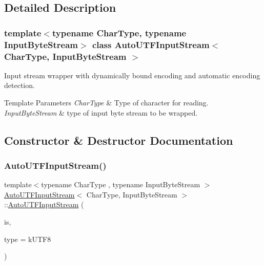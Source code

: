 \subsection{Detailed Description}
\subsubsection*{template$<$typename Char\+Type, typename Input\+Byte\+Stream$>$\newline
class Auto\+U\+T\+F\+Input\+Stream$<$ Char\+Type, Input\+Byte\+Stream $>$}

Input stream wrapper with dynamically bound encoding and automatic encoding detection. 


\begin{DoxyTemplParams}{Template Parameters}
{\em Char\+Type} & Type of character for reading. \\
\hline
{\em Input\+Byte\+Stream} & type of input byte stream to be wrapped. \\
\hline
\end{DoxyTemplParams}


\subsection{Constructor \& Destructor Documentation}
\mbox{\label{class_auto_u_t_f_input_stream_a83837fced0971ba26dd9a8ec1575abb0}} 
\subsubsection{\texorpdfstring{Auto\+U\+T\+F\+Input\+Stream()}{AutoUTFInputStream()}}
{\footnotesize\ttfamily template$<$typename Char\+Type , typename Input\+Byte\+Stream $>$ \\
\hyperlink{class_auto_u_t_f_input_stream}{Auto\+U\+T\+F\+Input\+Stream}$<$ Char\+Type, Input\+Byte\+Stream $>$\+::\hyperlink{class_auto_u_t_f_input_stream}{Auto\+U\+T\+F\+Input\+Stream} (\begin{DoxyParamCaption}\item[{Input\+Byte\+Stream \&}]{is,  }\item[{U\+T\+F\+Type}]{type = {\ttfamily kUTF8} }\end{DoxyParamCaption})\hspace{0.3cm}{\ttfamily [inline]}}



